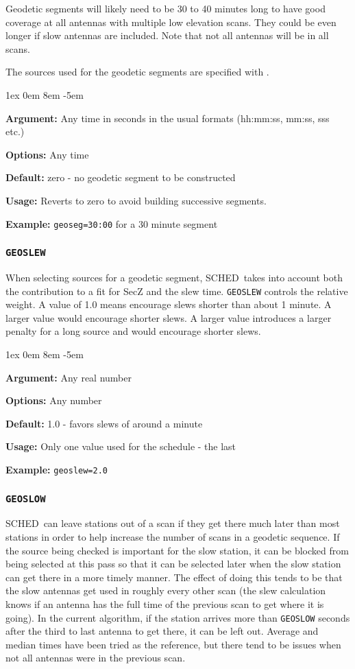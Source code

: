 \documentclass{report}
\newcommand{\schedb}{{\sc SCHED~}}
\newcommand{\rcwbox}[5]{
  \begin{list}{}{\parsep 1ex  \itemsep 0em
                 \leftmargin 8em  \itemindent -5em }
    \item {\bf Argument:} #1
    \item {\bf Options:}  #2
    \item {\bf Default:}  #3
    \item {\bf Usage:}    #4
    \item {\bf Example:}  #5
  \end{list}
}
\begin{document}
Geodetic segments will likely need to be 30 to 40 minutes long to have
good coverage at all antennas with multiple low elevation scans.  They
could be even longer if slow antennas are included.  Note that not all
antennas will be in all scans.

The sources used for the geodetic segments are specified with
.

\rcwbox
{Any time in seconds in the usual formats (hh:mm:ss, mm:ss, sss etc.)}
{Any time}
{zero - no geodetic segment to be constructed}
{Reverts to zero to avoid building successive segments.}
{{\tt geoseg=30:00} for a 30 minute segment}

\subsubsection{\label{MP:GEOSLEW}{\tt GEOSLEW}}

When selecting sources for a geodetic segment, \schedb takes into
account both the contribution to a fit for SecZ and the slew time.
{\tt GEOSLEW} controls the relative weight.  A value of 1.0 means
encourage slews shorter than about 1 minute.  A larger value would
encourage shorter slews.  A larger value introduces a larger penalty
for a long source and would encourage shorter slews.

\rcwbox
{Any real number}
{Any number}
{1.0 - favors slews of around a minute}
{Only one value used for the schedule - the last}
{{\tt geoslew=2.0}}


\subsubsection{\label{MP:GEOSLOW}{\tt GEOSLOW}}

\schedb can leave stations out of a scan if they get there much later
than most stations in order to help increase the number of scans in
a geodetic sequence.  If the source being checked is important for
the slow station, it can be blocked from being selected at this pass
so that it can be selected later when the slow station can get there in
a more timely manner.  The effect of doing this tends to be that the
slow antennas get used in roughly every other scan (the slew calculation
knows if an antenna has the full time of the previous scan to get where
it is going).  In the current algorithm, if the station arrives more
than {\tt GEOSLOW} seconds after the third to last antenna to get there,
it can be left out.  Average and median times have been tried as the
reference, but there tend to be issues when not all antennas were in
the previous scan.
\end{document}
